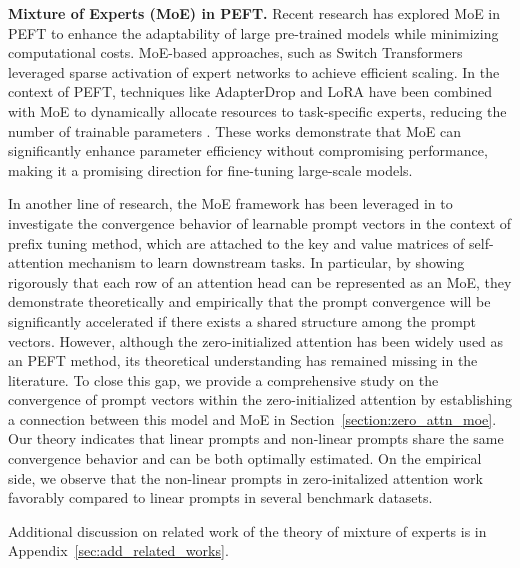 
\textbf{Mixture of Experts (MoE) in PEFT.} 
Recent research has explored MoE in PEFT to enhance the adaptability of large pre-trained models while minimizing computational costs. MoE-based approaches, such as Switch Transformers \cite{fedus2022switch} leveraged sparse activation of expert networks to achieve efficient scaling. In the context of PEFT, techniques like AdapterDrop \cite{ruckle2020adapterdrop} and LoRA \cite{hu2021lora} have been combined with MoE to dynamically allocate resources to task-specific experts, reducing the number of trainable parameters \cite{li2024mixlora,chen2024llava,chen2023adamv}. These works demonstrate that MoE can significantly enhance parameter efficiency without compromising performance, making it a promising direction for fine-tuning large-scale models.

In another line of research, the MoE framework has been leveraged in \cite{le2024mixture,le2024revisiting} to investigate the convergence behavior of learnable prompt vectors in the context of prefix tuning method, which are attached to the key and value matrices of self-attention mechanism to learn downstream tasks. 
In particular, by showing rigorously that each row of an attention head can be represented as an MoE, they demonstrate  theoretically and empirically that the prompt convergence will be significantly accelerated if there exists a shared structure among the prompt vectors. 
However, although the zero-initialized attention has been widely used as an PEFT method, its theoretical understanding has remained missing in the literature. To close this gap, we provide a comprehensive study on the convergence of prompt vectors within the zero-initialized attention by establishing a connection between this model and MoE in Section~\ref{section:zero_attn_moe}. Our theory indicates that linear prompts and non-linear prompts share the same convergence behavior and can be both optimally estimated. On the empirical side, we observe that the non-linear prompts in zero-initalized attention work favorably compared to linear prompts in several benchmark datasets.  

Additional discussion on related work of the theory of mixture of experts is in Appendix~\ref{sec:add_related_works}.

